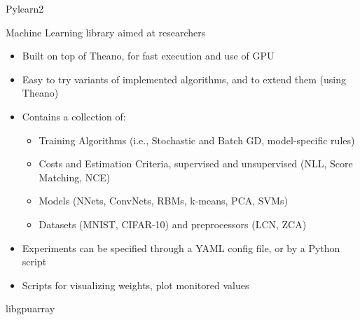 \documentclass[utf8x,xcolor=pdftex,dvipsnames,table]{beamer}
\begin{document}
\begin{frame}{Pylearn2}

  Machine Learning library aimed at researchers

  \begin{itemize}
    \item Built on top of Theano, for fast execution and use of GPU
    \item Easy to try variants of implemented algorithms, and to extend them (using Theano)
    \item Contains a collection of:
    \begin{itemize}
      \item Training Algorithms (i.e., Stochastic and Batch GD, model-specific rules)
      \item Costs and Estimation Criteria, supervised and unsupervised (NLL, Score Matching, NCE)
      \item Models (NNets, ConvNets, RBMs, k-means, PCA, SVMs)
      \item Datasets (MNIST, CIFAR-10) and preprocessors (LCN, ZCA)
    \end{itemize}
    \item Experiments can be specified through a YAML config file, or by a Python script
    \item Scripts for visualizing weights, plot monitored values
  \end{itemize}

\end{frame}


\begin{frame}{libgpuarray}
\end{frame}
\end{document}
